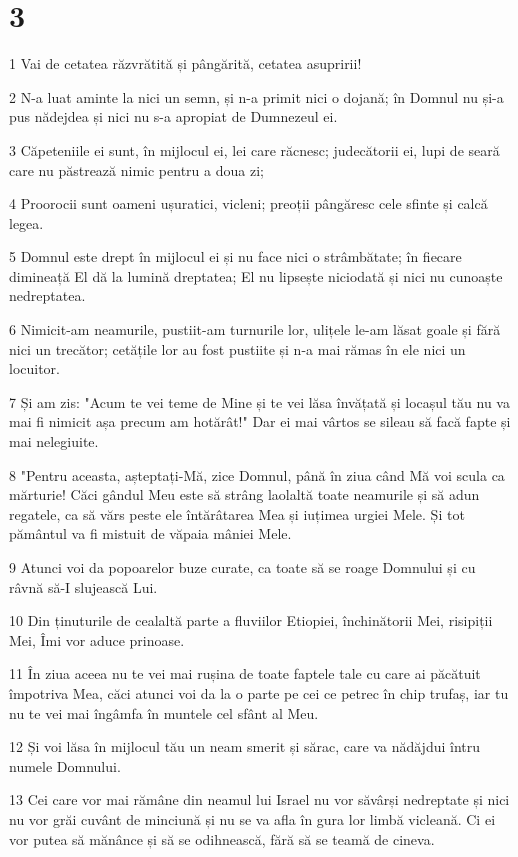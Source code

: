 \chapter{3}

\par 1 Vai de cetatea răzvrătită și pângărită, cetatea asupririi!
\par 2 N-a luat aminte la nici un semn, și n-a primit nici o dojană; în Domnul nu și-a pus nădejdea și nici nu s-a apropiat de Dumnezeul ei.
\par 3 Căpeteniile ei sunt, în mijlocul ei, lei care răcnesc; judecătorii ei, lupi de seară care nu păstrează nimic pentru a doua zi;
\par 4 Proorocii sunt oameni ușuratici, vicleni; preoții pângăresc cele sfinte și calcă legea.
\par 5 Domnul este drept în mijlocul ei și nu face nici o strâmbătate; în fiecare dimineață El dă la lumină dreptatea; El nu lipsește niciodată și nici nu cunoaște nedreptatea.
\par 6 Nimicit-am neamurile, pustiit-am turnurile lor, ulițele le-am lăsat goale și fără nici un trecător; cetățile lor au fost pustiite și n-a mai rămas în ele nici un locuitor.
\par 7 Și am zis: "Acum te vei teme de Mine și te vei lăsa învățată și locașul tău nu va mai fi nimicit așa precum am hotărât!" Dar ei mai vârtos se sileau să facă fapte și mai nelegiuite.
\par 8 "Pentru aceasta, așteptați-Mă, zice Domnul, până în ziua când Mă voi scula ca mărturie! Căci gândul Meu este să strâng laolaltă toate neamurile și să adun regatele, ca să vărs peste ele întărâtarea Mea și iuțimea urgiei Mele. Și tot pământul va fi mistuit de văpaia mâniei Mele.
\par 9 Atunci voi da popoarelor buze curate, ca toate să se roage Domnului și cu râvnă să-I slujească Lui.
\par 10 Din ținuturile de cealaltă parte a fluviilor Etiopiei, închinătorii Mei, risipiții Mei, Îmi vor aduce prinoase.
\par 11 În ziua aceea nu te vei mai rușina de toate faptele tale cu care ai păcătuit împotriva Mea, căci atunci voi da la o parte pe cei ce petrec în chip trufaș, iar tu nu te vei mai îngâmfa în muntele cel sfânt al Meu.
\par 12 Și voi lăsa în mijlocul tău un neam smerit și sărac, care va nădăjdui întru numele Domnului.
\par 13 Cei care vor mai rămâne din neamul lui Israel nu vor săvârși nedreptate și nici nu vor grăi cuvânt de minciună și nu se va afla în gura lor limbă vicleană. Ci ei vor putea să mănânce și să se odihnească, fără să se teamă de cineva.
